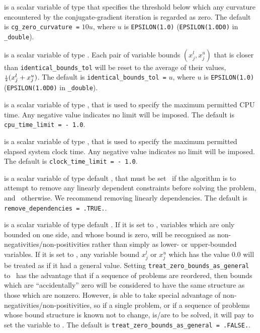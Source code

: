 \begin{description}
 is a scalar variable of type \realdp
that specifies the threshold below which any curvature
encountered by the conjugate-gradient iteration is regarded as zero.
The default is {\tt cg\_zero\_curvature =} $10 u$,
where $u$ is {\tt EPSILON(1.0)} ({\tt EPSILON(1.0D0)} in
{\tt \fullpackagename\_double}).

is a scalar variable of type \realdp.
Each pair of variable bounds $(x_{j}^{l}, x_{j}^{u})$
that is closer than {\tt identical\_bounds\_tol}
will be reset to the average of their values,
${\scriptstyle \frac{1}{2}} (x_{j}^{l} + x_{j}^{u})$.
The default is {\tt identical\_bounds\_tol =} $u$,
where $u$ is {\tt EPSILON(1.0)} ({\tt EPSILON(1.0D0)} in
{\tt \fullpackagename\_double}).

 is a scalar variable of type \realdp,
that is used to specify the maximum permitted CPU time. Any negative
value indicates no limit will be imposed. The default is
{\tt cpu\_time\_limit = - 1.0}.

 is a scalar variable of type \realdp,
that is used to specify the maximum permitted elapsed system clock time.
Any negative value indicates no limit will be imposed. The default is
{\tt clock\_time\_limit = - 1.0}.

 is a scalar variable of type
default \logical, that must be set \true\ if the algorithm
is to attempt to remove any linearly dependent constraints before
solving the problem, and \false\ otherwise.
We recommend removing linearly dependencies.
The default is {\tt remove\_dependencies = .TRUE.}.

 is a scalar variable of type
default \logical.
If it is set to \false, variables which
are only bounded on one side, and whose bound is zero,
will be recognised as non-negativities/non-positivities rather than simply as
lower- or upper-bounded variables.
If it is set to \true, any variable bound
$x_{j}^{l}$ or $x_{j}^{u}$ which has the value 0.0 will be
treated as if it had a general value.
Setting {\tt treat\_zero\_bounds\_as\_general} to \true\ has the advantage
that if a sequence of problems are reordered, then bounds which are
``accidentally'' zero will be considered to have the same structure as
those which are nonzero. However, {\tt \fullpackagename} is
able to take special advantage of non-negativities/non-positivities, so
if a single problem, or if a sequence of problems whose
bound structure is known not to change, is/are to be solved,
it will pay to set the variable to \false.
The default is {\tt treat\_zero\_bounds\_as\_general = .FALSE.}.


\end{description}
